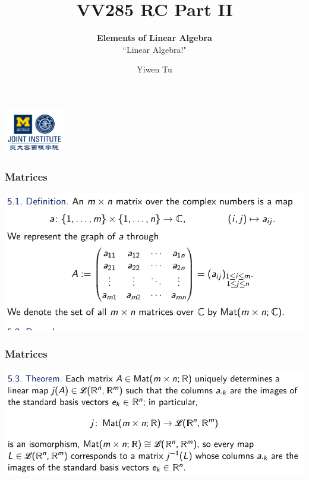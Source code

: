 \documentclass[12pt, t]{beamer}
\title{VV285 RC Part II}
\subtitle{\textbf{Elements of Linear Algebra}\\``Linear Algebra!"}
\institute[UM-SJTU JI]{Univerity of Michigan-Shanghai Jiao Tong University Joint Institute}
\author{Yiwen Tu}
\begin{document}
\begin{frame}
    \titlepage
    \begin{center}
        \includegraphics[height=2cm]{logo2.png}
    \end{center}
\end{frame}
    
\begin{frame}
    \frametitle{Matrices}
    \begin{center}
        \includegraphics[width=\textwidth]{2}
    \end{center}
\end{frame}

\begin{frame}
    \frametitle{Matrices}
    \begin{center}
        \includegraphics[width=\textwidth]{3}
    \end{center}
\end{frame}
\end{document}
